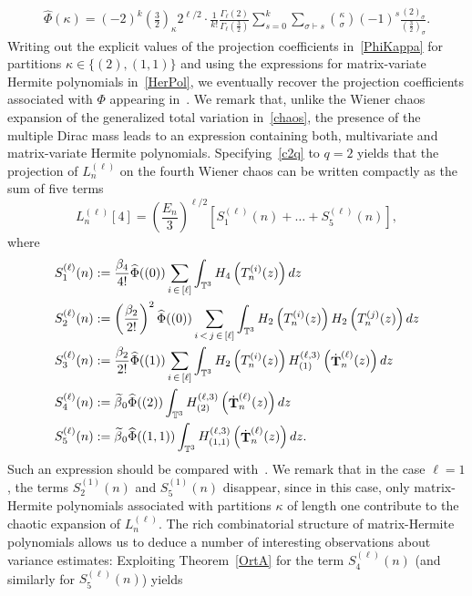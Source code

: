 \documentclass[10pt]{amsart}
\theoremstyle{definition}\newtheorem{defi}[theo]{Definition}\newtheorem{rema}[theo]{Remark}\newtheorem{exam}[theo]{Example}\newtheorem{exem}[theo]{Example}\newtheorem{nota}[theo]{Notation}
\DeclareMathOperator{\bT}{\mathbf{T}}
\newcommand{\T}{\mathbb{T}^3}
\let\oldtilde\tilde
\renewcommand*{\tilde}[1]{\mathchoice{\widetilde{#1}}{\widetilde{#1}}{\oldtilde{#1}}{\oldtilde{#1}}}
\begin{document}
\begin{gather}\label{PhiKappa}
\widehat{\Phi}(\kappa) = (-2)^{k} \left(\frac{3}{2}\right)_{\kappa} 2^{\ell/2} \cdot \frac{1}{k!}\frac{\Gamma_{\ell}(2)}{\Gamma_{\ell}\left(\frac{3}{2}\right)} \sum_{s=0}^{k} \sum_{\sigma \vdash s} \binom{\kappa}{\sigma} (-1)^s\frac{(2)_{\sigma}}{\left(\frac{3}{2}\right)_{\sigma}}.
\end{gather}
Writing out the explicit values of the projection coefficients in~\eqref{PhiKappa} for partitions $\kappa\in \{(2),(1,1)\}$ and using the expressions for matrix-variate Hermite polynomials in~\eqref{HerPol}, we eventually recover the projection coefficients associated with $\Phi$ appearing in~\cite[Proposition~B.5]{Not20}. We remark that, unlike the Wiener chaos expansion of the generalized total variation in~\eqref{chaos}, the presence of the multiple Dirac mass leads to an expression containing both, multivariate and matrix-variate Hermite polynomials. Specifying~\eqref{c2q} to $q=2$ yields that the projection of $L_n^{(\ell)}$ on the fourth Wiener chaos can be written compactly as the sum of five terms
\[
L_n^{(\ell)}[4]=
\left(\frac{E_n}{3}\right)^{\ell/2} \left[S_1^{(\ell)}(n)+\ldots+S_5^{(\ell)}(n)\right],
\]
where
\begin{align*}
S_1^{(\ell)}(n)&:= \frac{\beta_4}{4!}\widehat{\Phi}((0))\sum_{i\,\in\,[\ell]} \int_{\T} H_4\left(T_n^{(i)}(z)\right) dz\\
S_2^{(\ell)}(n) &:=\left(\frac{\beta_2 }{2! }\right)^2\widehat{\Phi}((0))\sum_{i\,<\,j\,\in\,[\ell]} \int_{\T} H_2\left(T_n^{(i)}(z)\right)H_2\left(T_n^{(j)}(z)\right)dz\\
S_3^{(\ell)}(n) &:=\frac{\beta_2}{2!}\widehat{\Phi}((1))\sum_{i\,\in\,[\ell]} \int_{\T} H_2\left(T_n^{(i)}(z)\right) H^{(\ell,3)}_{(1)}\left(\dot{\bT}_n^{(\ell)}(z)\right) dz\\
S_4^{(\ell)}(n) &:=\tilde{\beta}_0\widehat{\Phi}((2)) \int_{\T} H_{(2)}^{(\ell,3)}\left(\dot{\bT}_n^{(\ell)}(z)\right) dz\\
S_5^{(\ell)}(n) &:=\tilde{\beta}_0\widehat{\Phi}((1,1)) \int_{\T} H_{(1,1)}^{(\ell,3)}\left(\dot{\bT}_n^{(\ell)}(z)\right)dz.
\end{align*}
Such an expression should be compared with~\cite[Eq.(3.23)]{Not20}. We remark that in the case $\ell=1$, the terms $S_2^{(1)}(n)$ and $S_5^{(1)}(n)$ disappear, since in this case, only matrix-Hermite polynomials associated with partitions $\kappa$ of length one contribute to the chaotic expansion of $L_n^{(\ell)}$. The rich combinatorial structure of matrix-Hermite polynomials allows us to deduce a number of interesting observations about variance estimates: Exploiting Theorem~\ref{OrtA} for the term $S_4^{(\ell)}(n)$ (and similarly for $S_5^{(\ell)}(n)$) yields
\end{document}
